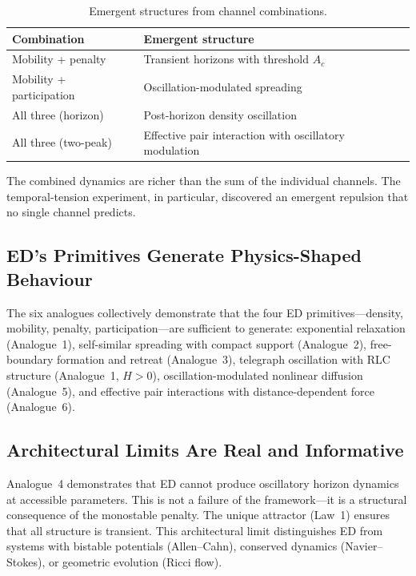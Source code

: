 \documentclass[11pt]{article}
\begin{document}
\begin{table}[h]
\centering
\begin{tabular}{@{}ll@{}}
\toprule
Combination & Emergent structure \\
\midrule
Mobility + penalty & Transient horizons with threshold \(A_c\) \\
Mobility + participation & Oscillation-modulated spreading \\
All three (horizon) & Post-horizon density oscillation \\
All three (two-peak) & Effective pair interaction with oscillatory modulation \\
\bottomrule
\end{tabular}
\caption{Emergent structures from channel combinations.}
\label{tab:emergent}
\end{table}

The combined dynamics are richer than the sum of the individual channels. The temporal-tension experiment, in particular, discovered an emergent repulsion that no single channel predicts.

\subsection{ED's Primitives Generate Physics-Shaped Behaviour}

The six analogues collectively demonstrate that the four ED primitives---density, mobility, penalty, participation---are sufficient to generate: exponential relaxation (Analogue~1), self-similar spreading with compact support (Analogue~2), free-boundary formation and retreat (Analogue~3), telegraph oscillation with RLC structure (Analogue~1, \(H > 0\)), oscillation-modulated nonlinear diffusion (Analogue~5), and effective pair interactions with distance-dependent force (Analogue~6).

\subsection{Architectural Limits Are Real and Informative}

Analogue~4 demonstrates that ED cannot produce oscillatory horizon dynamics at accessible parameters. This is not a failure of the framework---it is a structural consequence of the monostable penalty. The unique attractor (Law~1) ensures that all structure is transient. This architectural limit distinguishes ED from systems with bistable potentials (Allen--Cahn), conserved dynamics (Navier--Stokes), or geometric evolution (Ricci flow).
\end{document}
